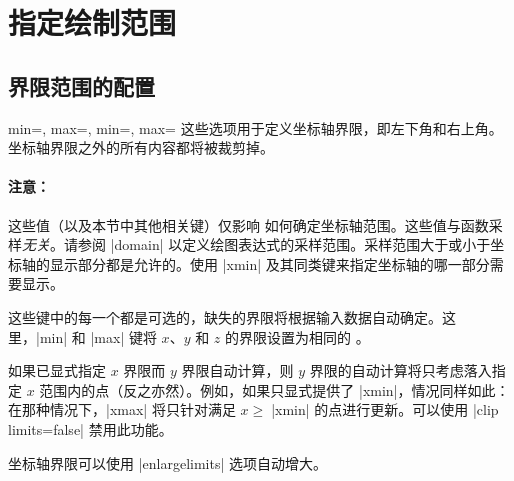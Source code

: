 
\section{指定绘制范围}

\subsection{界限范围的配置}

\begin{pgfplotsxykeylist}{%
    \x min=,
    \x max=,
    min=,
    max=%
}
\label{page:access:limits}
    这些选项用于定义坐标轴界限，即左下角和右上角。坐标轴界限之外的所有内容都将被裁剪掉。


    \paragraph{注意：}

    这些值（以及本节中其他相关键）仅影响 \PGFPlots{} 如何确定坐标轴范围。这些值与函数采样\emph{无关}。请参阅 |domain| 以定义绘图表达式的采样范围。采样范围大于或小于坐标轴的显示部分都是允许的。使用 |xmin| 及其同类键来指定坐标轴的哪一部分需要显示。

    这些键中的每一个都是可选的，缺失的界限将根据输入数据自动确定。这里，|min| 和 |max| 键将 $x$、$y$ 和 $z$ 的界限设置为相同的 。

    如果已显式指定 $x$ 界限而 $y$ 界限自动计算，则 $y$ 界限的自动计算将只考虑落入指定 $x$ 范围内的点（反之亦然）。例如，如果只显式提供了 |xmin|，情况同样如此：在那种情况下，|xmax| 将只针对满足 $x \ge \;$|xmin| 的点进行更新。可以使用 |clip limits=false| 禁用此功能。

    坐标轴界限可以使用 |enlargelimits| 选项自动增大。
\begin{codeexample}[]
\end{codeexample}

\begin{codeexample}[]
\end{codeexample}


\end{pgfplotsxykeylist}
